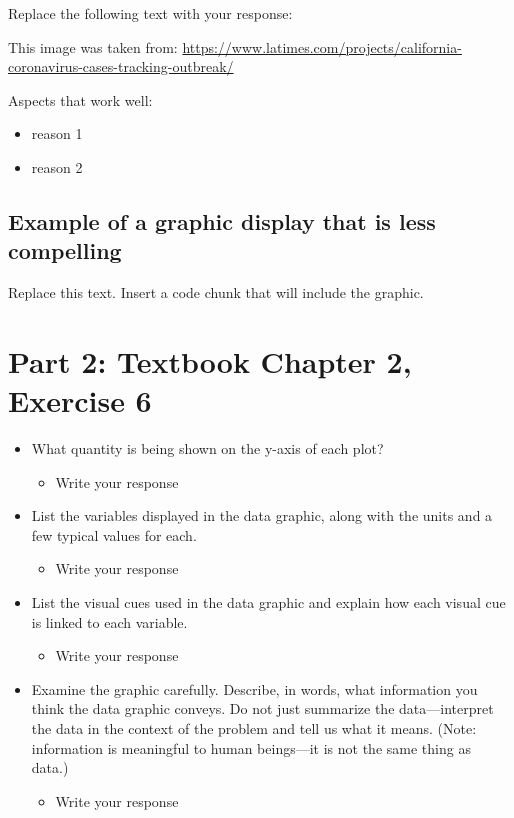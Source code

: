 \documentclass[
]{article}
\providecommand{\tightlist}{%
  \setlength{\itemsep}{0pt}\setlength{\parskip}{0pt}}
\begin{document}
Replace the following text with your response:

This image was taken from:
\url{https://www.latimes.com/projects/california-coronavirus-cases-tracking-outbreak/}

Aspects that work well:

\begin{itemize}
\tightlist
\item
  reason 1
\item
  reason 2
\end{itemize}

\hypertarget{example-of-a-graphic-display-that-is-less-compelling}{%
\subsection{Example of a graphic display that is less
compelling}\label{example-of-a-graphic-display-that-is-less-compelling}}

Replace this text. Insert a code chunk that will include the graphic.

\hypertarget{part-2-textbook-chapter-2-exercise-6}{%
\section{Part 2: Textbook Chapter 2, Exercise
6}\label{part-2-textbook-chapter-2-exercise-6}}

\begin{itemize}
\tightlist
\item
  What quantity is being shown on the y-axis of each plot?

  \begin{itemize}
  \tightlist
  \item
    Write your response
  \end{itemize}
\item
  List the variables displayed in the data graphic, along with the units
  and a few typical values for each.

  \begin{itemize}
  \tightlist
  \item
    Write your response
  \end{itemize}
\item
  List the visual cues used in the data graphic and explain how each
  visual cue is linked to each variable.

  \begin{itemize}
  \tightlist
  \item
    Write your response
  \end{itemize}
\item
  Examine the graphic carefully. Describe, in words, what information
  you think the data graphic conveys. Do not just summarize the
  data---interpret the data in the context of the problem and tell us
  what it means. (Note: information is meaningful to human beings---it
  is not the same thing as data.)

  \begin{itemize}
  \tightlist
  \item
    Write your response
  \end{itemize}
\end{itemize}
\end{document}
